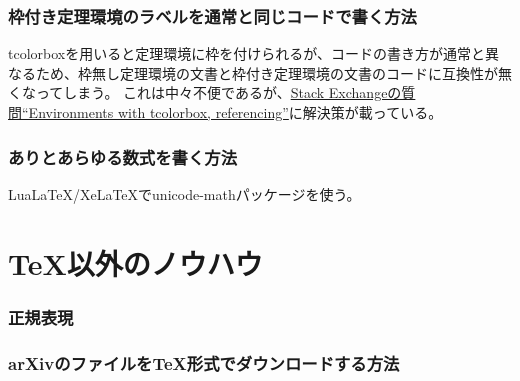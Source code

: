 \documentclass[11pt,a4paper,oneside,lualatex]{ltjsarticle} %
\numberwithin{equation}{section} %
\begin{document}

\subsubsection{枠付き定理環境のラベルを通常と同じコードで書く方法}


tcolorboxを用いると定理環境に枠を付けられるが、コードの書き方が通常と異なるため、枠無し定理環境の文書と枠付き定理環境の文書のコードに互換性が無くなってしまう。
これは中々不便であるが、\href{https://tex.stackexchange.com/questions/633490/environments-with-tcolorbox-referencing}{Stack Exchangeの質問``Environments with tcolorbox, referencing''}に解決策が載っている。


\subsubsection{ありとあらゆる数式を書く方法}


LuaLaTeX/XeLaTeXでunicode-mathパッケージを使う。


\section{TeX以外のノウハウ} \label{sec:know-how_others}




\subsubsection{正規表現}




\subsubsection{arXivのファイルをTeX形式でダウンロードする方法}
\end{document}
